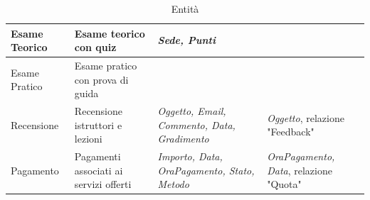 \documentclass[10pt,twoside]{article}
\begin{document}
{\begin{table}[H]
\begin{tabularx}{\textwidth}{|>{\centering\arraybackslash}p{2.6cm}|>{\centering\arraybackslash}X|>{\centering\arraybackslash}p{4.85cm}|>{\centering\arraybackslash}X|}
            \hline
            \rowcolor{white!40}
            Esame Teorico & Esame teorico con quiz & \textit{Sede, Punti} & \\
            \hline
            \rowcolor{white!40}
            Esame Pratico & Esame pratico con prova di guida & & \\
            \hline
            \rowcolor{white!40}
            Recensione & Recensione istruttori e lezioni & \textit{Oggetto, Email, Commento, Data, Gradimento} & \textit{Oggetto}, relazione "Feedback"\\
            \hline
            \rowcolor{white!40}
            Pagamento & Pagamenti associati ai servizi offerti & \textit{Importo, Data, OraPagamento, Stato, Metodo} & \textit{OraPagamento, Data}, relazione "Quota"\\
            \hline
        \end{tabularx}
        \caption{Entità}
        \label{fig:tabellaEntita}
    \end{table}

}
\end{document}
